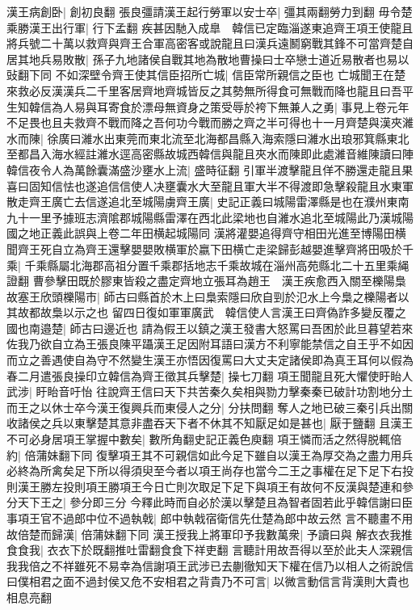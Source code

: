 漢王病創卧|{
	創初良翻}
張良彊請漢王起行勞軍以安士卒|{
	彊其兩翻勞力到翻}
毋令楚乘勝漢王出行軍|{
	行下孟翻}
疾甚因馳入成臯　韓信已定臨淄遂東追齊王項王使龍且將兵號二十萬以救齊與齊王合軍高密客或說龍且曰漢兵遠鬭窮戰其鋒不可當齊楚自居其地兵易敗散|{
	孫子九地諸侯自戰其地為散地曹操曰士卒戀士道近易散者也易以䜴翻下同}
不如深壁令齊王使其信臣招所亡城|{
	信臣常所親信之臣也}
亡城聞王在楚來救必反漢漢兵二千里客居齊地齊城皆反之其勢無所得食可無戰而降也龍且曰吾平生知韓信為人易與耳寄食於漂母無資身之策受辱於袴下無兼人之勇|{
	事見上卷元年}
不足畏也且夫救齊不戰而降之吾何功今戰而勝之齊之半可得也十一月齊楚與漢夾濰水而陳|{
	徐廣曰濰水出東莞而東北流至北海都昌縣入海索隱曰濰水出琅邪箕縣東北至都昌入海水經註濰水逕高密縣故城西韓信與龍且夾水而陳即此處濰音維陳讀曰陣}
韓信夜令人為萬餘囊滿盛沙壅水上流|{
	盛時征翻}
引軍半渡擊龍且佯不勝還走龍且果喜曰固知信怯也遂追信信使人决壅囊水大至龍且軍大半不得渡即急擊殺龍且水東軍散走齊王廣亡去信遂追北至城陽虜齊王廣|{
	史記正義曰城陽雷澤縣是也在濮州東南九十一里予據班志濟隂郡城陽縣雷澤在西北此梁地也自濰水追北至城陽此乃漢城陽國之地正義此誤與上卷二年田横起城陽同}
漢將灌嬰追得齊守相田光進至博陽田横聞齊王死自立為齊王還擊嬰嬰敗横軍於嬴下田横亡走梁歸彭越嬰進擊齊將田吸於千乘|{
	千乘縣屬北海郡高祖分置千乘郡括地志千乘故城在淄州高苑縣北二十五里乘䋲證翻}
曹參擊田既於膠東皆殺之盡定齊地立張耳為趙王　漢王疾愈西入關至櫟陽梟故塞王欣頭櫟陽市|{
	師古曰縣首於木上曰梟索隱曰欣自剄於氾水上今梟之櫟陽者以其故都故梟以示之也}
留四日復如軍軍廣武　韓信使人言漢王曰齊偽詐多變反覆之國也南邉楚|{
	師古曰邊近也}
請為假王以鎮之漢王發書大怒罵曰吾困於此旦暮望若來佐我乃欲自立為王張良陳平躡漢王足因附耳語曰漢方不利寧能禁信之自王乎不如因而立之善遇使自為守不然變生漢王亦悟因復罵曰大丈夫定諸侯即為真王耳何以假為春二月遣張良操印立韓信為齊王徵其兵擊楚|{
	操七刀翻}
項王聞龍且死大懼使盱眙人武涉|{
	盱眙音吁怡}
往說齊王信曰天下共苦秦久矣相與勠力擊秦秦已破計功割地分土而王之以休士卒今漢王復興兵而東侵人之分|{
	分扶問翻}
奪人之地已破三秦引兵出關收諸侯之兵以東擊楚其意非盡吞天下者不休其不知厭足如是甚也|{
	厭于鹽翻}
且漢王不可必身居項王掌握中數矣|{
	數所角翻史記正義色庾翻}
項王憐而活之然得脱輒倍約|{
	倍蒲妹翻下同}
復擊項王其不可親信如此今足下雖自以漢王為厚交為之盡力用兵必終為所禽矣足下所以得須臾至今者以項王尚存也當今二王之事權在足下足下右投則漢王勝左投則項王勝項王今日亡則次取足下足下與項王有故何不反漢與楚連和參分天下王之|{
	參分即三分}
今釋此時而自必於漢以擊楚且為智者固若此乎韓信謝曰臣事項王官不過郎中位不過執戟|{
	郎中執戟宿衛信先仕楚為郎中故云然}
言不聽畫不用故倍楚而歸漢|{
	倍蒲妹翻下同}
漢王授我上將軍印予我數萬衆|{
	予讀曰與}
解衣衣我推食食我|{
	衣衣下於既翻推吐雷翻食食下祥吏翻}
言聽計用故吾得以至於此夫人深親信我我倍之不祥雖死不易幸為信謝項王武涉已去蒯徹知天下權在信乃以相人之術說信曰僕相君之面不過封侯又危不安相君之背貴乃不可言|{
	以微言動信言背漢則大貴也相息亮翻}
